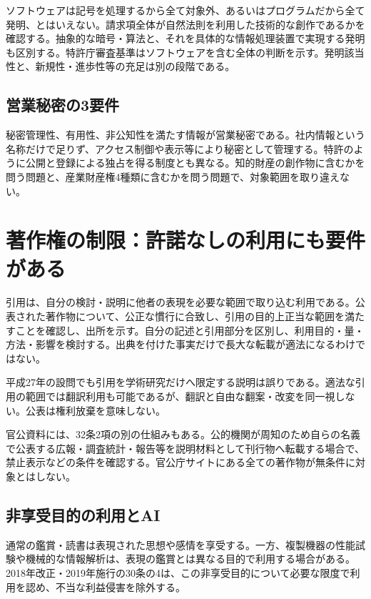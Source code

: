 ソフトウェアは記号を処理するから全て対象外、あるいはプログラムだから全て発明、とはいえない。請求項全体が自然法則を利用した技術的な創作であるかを確認する。抽象的な暗号・算法と、それを具体的な情報処理装置で実現する発明も区別する。特許庁審査基準はソフトウェアを含む全体の判断を示す\parencite{jpo_invention_criteria}。発明該当性と、新規性・進歩性等の充足は別の段階である。

\subsection{営業秘密の3要件}
\label{theory:compliance:secret}
秘密管理性、有用性、非公知性を満たす情報が営業秘密である\parencite{meti_trade_secret}。社内情報という名称だけで足りず、アクセス制御や表示等により秘密として管理する。特許のように公開と登録による独占を得る制度とも異なる。知的財産の創作物に含むかを問う問題と、産業財産権4種類に含むかを問う問題で、対象範囲を取り違えない。

\section{著作権の制限：許諾なしの利用にも要件がある}
\label{theory:compliance:citation}
引用は、自分の検討・説明に他者の表現を必要な範囲で取り込む利用である。公表された著作物について、公正な慣行に合致し、引用の目的上正当な範囲を満たすことを確認し、出所を示す。自分の記述と引用部分を区別し、利用目的・量・方法・影響を検討する。出典を付けた事実だけで長大な転載が適法になるわけではない\parencite{bunka_citation_faq}。

平成27年の設問でも引用を学術研究だけへ限定する説明は誤りである。適法な引用の範囲では翻訳利用も可能であるが、翻訳と自由な翻案・改変を同一視しない\parencite{kyushu_copyright2015}。公表は権利放棄を意味しない。

官公資料には、32条2項の別の仕組みもある。公的機関が周知のため自らの名義で公表する広報・調査統計・報告等を説明材料として刊行物へ転載する場合で、禁止表示などの条件を確認する\parencite{cabinet_copyright2008}。官公庁サイトにある全ての著作物が無条件に対象とはしない。

\subsection{非享受目的の利用とAI}
\label{theory:compliance:nonenjoyment}
通常の鑑賞・読書は表現された思想や感情を享受する。一方、複製機器の性能試験や機械的な情報解析は、表現の鑑賞とは異なる目的で利用する場合がある。2018年改正・2019年施行の30条の4は、この非享受目的について必要な限度で利用を認め、不当な利益侵害を除外する\parencite{bunka_amend2018}。

